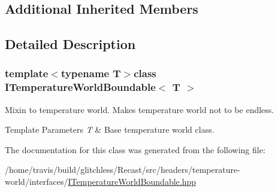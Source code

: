 \subsection*{Additional Inherited Members}


\subsection{Detailed Description}
\subsubsection*{template$<$typename T$>$class I\-Temperature\-World\-Boundable$<$ T $>$}

Mixin to temperature world. Makes temperature world not to be endless.


\begin{DoxyTemplParams}{Template Parameters}
{\em T} & Base temperature world class. \\
\hline
\end{DoxyTemplParams}


The documentation for this class was generated from the following file\-:\begin{DoxyCompactItemize}
\item 
/home/travis/build/glitchless/\-Recast/src/headers/temperature-\/world/interfaces/\hyperlink{_i_temperature_world_boundable_8hpp}{I\-Temperature\-World\-Boundable.\-hpp}\end{DoxyCompactItemize}
